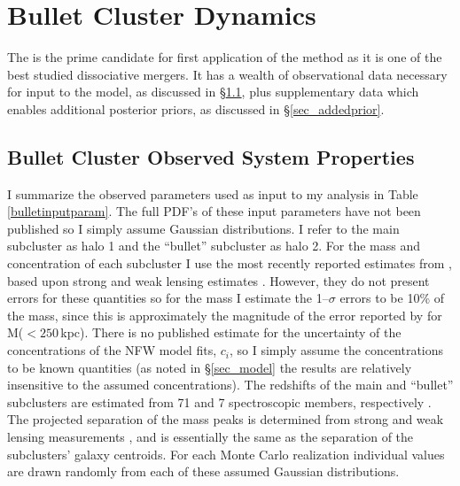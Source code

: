 \documentclass[12pt]{emulateapj}
\begin{document}
%


\section{Bullet Cluster Dynamics}\label{sec_bullet}

The  is the prime candidate for first application of the method as it is one of the best studied dissociative mergers.
It has a wealth of observational data necessary for input to the model, as discussed in \S\ref{sec_bc_obsprop}, plus supplementary data which enables additional posterior priors, as discussed in \S\ref{sec_addedprior}.

\subsection{Bullet Cluster Observed System Properties}\label{sec_bc_obsprop}

I summarize the observed  parameters used as input to my analysis in Table \ref{bulletinputparam}.  
The full PDF's of these input parameters have not been published so I simply assume Gaussian distributions.
I refer to the main subcluster as halo 1 and the ``bullet'' subcluster as halo 2.  
For the mass and concentration of each subcluster I use the most recently reported estimates from \citet{Springel:2007bg}, based upon strong and weak lensing estimates \citep{Bradac:2006be}.
However, they do not present errors for these quantities so for the mass I estimate the  1--$\sigma$ errors to be 10\% of the mass, since this is approximately the magnitude of the error reported by \citet{Bradac:2006be} for M($<250$\,kpc).
There is no published estimate for the uncertainty of the concentrations of the NFW model fits, $c_i$, so I simply assume the concentrations to be known quantities (as noted in \S\ref{sec_model} the results are relatively insensitive to the assumed concentrations). 
The redshifts of the main and ``bullet'' subclusters are estimated from 71 and 7 spectroscopic members, respectively \citep{Barrena:2002dj}.
The projected separation of the mass peaks is determined from strong and weak lensing measurements \citep{Bradac:2006be}, and is essentially the same as the separation of the subclusters' galaxy centroids.
For each Monte Carlo realization individual values are drawn randomly from each of these assumed Gaussian distributions.
\end{document}
